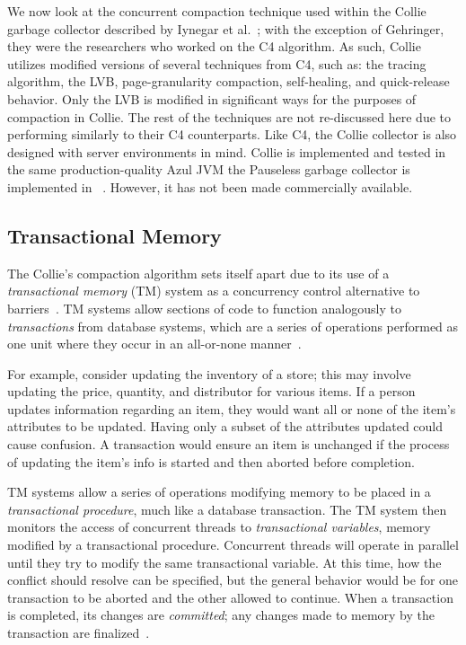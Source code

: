 \documentclass{sig-alternate}
\begin{document}
We now look at the concurrent compaction technique used within the 
Collie garbage collector described by Iynegar et al.~\cite{Iyengar:Collie};
with the exception of Gehringer, they were the researchers who worked on the C4 algorithm.
As such, Collie utilizes modified versions of several techniques from C4, such as:
the tracing algorithm, the LVB, page-granularity compaction, self-healing, and quick-release behavior.
Only the LVB is modified in significant ways for the purposes of compaction in Collie.
The rest of the techniques are not re-discussed here due to performing 
similarly to their C4 counterparts. Like C4, the Collie
collector is also designed with server environments in mind. Collie is implemented and tested in 
the same production-quality Azul JVM the Pauseless garbage collector is implemented in
~\cite{Click:Pauseless}. However, it has not been made commercially available.


\subsection{Transactional Memory}
\label{sec:collieTM}

The Collie's compaction algorithm sets itself apart due to its use 
of a \emph{transactional memory} (TM) system as a concurrency control 
alternative to barriers~\cite{Iyengar:Collie}. TM systems allow
sections of code to function 
analogously to \emph{transactions} from database systems, 
which are a series of operations performed as one unit where 
they occur in an all-or-none manner~\cite{wiki:atomicity}.

For example, consider updating the inventory of a store; this may involve updating
the price, quantity, and distributor for various items. 
If a person updates information regarding an item, they would 
want all or none of the item's attributes to be updated. Having
only a subset of the attributes updated could cause confusion. A transaction
would ensure an item is unchanged if the process of updating the item's info 
is started and then aborted before completion.

TM systems allow a series
of operations modifying memory to be placed in
a \emph{transactional procedure}, much like a database transaction.
The TM system then monitors the access of concurrent threads to \emph{transactional variables},
memory modified by a transactional procedure.
Concurrent threads will operate in parallel until they try to modify
the same transactional variable. At this time, how 
the conflict should resolve can be specified, but the general behavior would be for one transaction
to be aborted and the other allowed to continue.
When a transaction is completed, its changes are \emph{committed}; any changes 
made to memory by the transaction are finalized~\cite{wiki:transactional-memory}.
\end{document}
